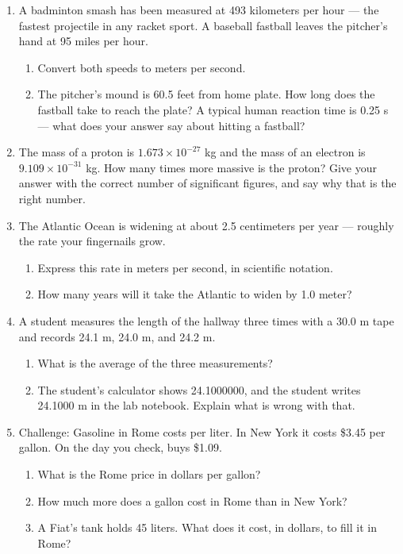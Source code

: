 \documentclass[12pt, twoside]{article}
\begin{document}
\begin{enumerate}[itemsep=0.5cm]
\item A badminton smash has been measured at 493 kilometers per hour --- the fastest
  projectile in any racket sport. A baseball fastball leaves the pitcher's hand at
  95 miles per hour.
  \begin{enumerate}[itemsep=2.4cm]
    \item Convert both speeds to meters per second.
    \item The pitcher's mound is 60.5 feet from home plate. How long does the
      fastball take to reach the plate? A typical human reaction time is 0.25 s ---
      what does your answer say about hitting a fastball?
  \end{enumerate} \vspace{2.2cm}

\item The mass of a proton is $1.673 \times 10^{-27}$ kg and the mass of an electron
  is $9.109 \times 10^{-31}$ kg. How many times more massive is the proton? Give your
  answer with the correct number of significant figures, and say why that is the
  right number.

\newpage

\item The Atlantic Ocean is widening at about 2.5 centimeters per year --- roughly
  the rate your fingernails grow.
  \begin{enumerate}[itemsep=2.8cm]
    \item Express this rate in meters per second, in scientific notation.
    \item How many years will it take the Atlantic to widen by 1.0 meter?
  \end{enumerate} \vspace{2.4cm}

\item A student measures the length of the hallway three times with a 30.0 m tape
  and records 24.1 m, 24.0 m, and 24.2 m.
  \begin{enumerate}[itemsep=1.5cm]
    \item What is the average of the three measurements?
    \item The student's calculator shows 24.1000000, and the student writes
      24.1000 m in the lab notebook. Explain what is wrong with that.
  \end{enumerate} \vspace{1.6cm}

\item Challenge: Gasoline in Rome costs  per liter. In New York it costs
  \$3.45 per gallon. On the day you check,  buys \$1.09.
  \begin{enumerate}[itemsep=1.6cm]
    \item What is the Rome price in dollars per gallon?
    \item How much more does a gallon cost in Rome than in New York?
    \item A Fiat's tank holds 45 liters. What does it cost, in dollars, to fill it
      in Rome?
  \end{enumerate}

\end{enumerate}
\end{document}
